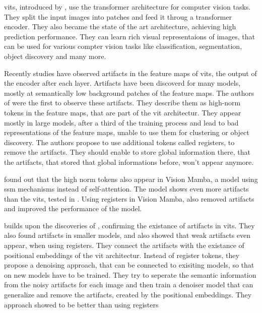 \documentclass[conference]{IEEEtran}
\begin{document}
  \acfp{vit}, introduced by \cite{visiontransformers2021}, use the transformer architecture for computer vision tasks. They split the input images into patches and feed it throug a transformer encoder. They also became the state of the art architecture, achieving high prediction performance. They can learn rich visual representaions of images, that can be used for various compter vision tasks like classification, segmentation, object discovery and many more. \cite{visiontransformers2021} \cite{vit-state-challenges}

  Recently studies have observed artifacts in the feature maps of \acp{vit}, the output of the encoder after each layer. Artifacts have been discoverd for many models, mostly at semantically low background patches of the feature maps. \cite{registers} \cite{denoising} The authors of \cite{registers} were the first to observe these artifacts. They describe them as high-norm tokens in the feature maps, that are part of the \ac{vit} architectur. They appear mostly in large models, after a third of the training process and lead to bad representations of the feature maps, unable to use them for clustering or object discovery. The authors propose to use additional tokens called registers, to remove the artifacts. They should enable to store global information there, that the artifacts, that stored that global informations before, won't appear anymore.

  \cite{mamba-needs-registers} found out that the high norm tokens also appear in Vision Mamba, a model using \ac{ssm} mechanisms instead of self-attention. The model shows even more artifacts than the \acp{vit}, tested in \cite{registers}. Using registers in Vision Mamba, also removed artifacts and improved the performance of the model. \cite{mamba-needs-registers}

  \cite{denoising} builds upon the discoveries of \cite{registers}, confirming the existance of artifacts in \acp{vit}. They also found artifacts in smaller models, and also showed that weak artifacts even appear, when using registers. They connect the artifacts with the existance of positional embeddings of the \ac{vit} architectur. Instead of register tokens, they propose a denoising approach, that can be connected to exisiting models, so that on new models have to be trained. They try to seperate the semantic information from the noisy artifacts for each image and then train a denoiser model that can generalize and remove the artifacts, created by the positional embeddings. They approach showed to be better than using registers \cite{denoising}
\end{document}
